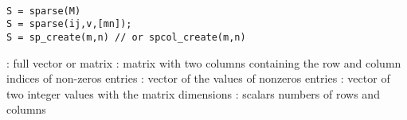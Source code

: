 
\begin{mandesc}
  \\
\end{mandesc}
\begin{calling_sequence}
\begin{verbatim}
S = sparse(M)
S = sparse(ij,v,[mn]);
S = sp_create(m,n) // or spcol_create(m,n)
\end{verbatim}

\end{calling_sequence}
\begin{parameters}
  \begin{varlist}
    :  full vector or matrix  
    : matrix with two columns containing the row and column indices of 
                non-zeros entries  
    : vector of the values of nonzeros entries
    : vector of two integer values with the matrix dimensions 
    : scalars numbers of rows and columns
  \end{varlist}
\end{parameters}

